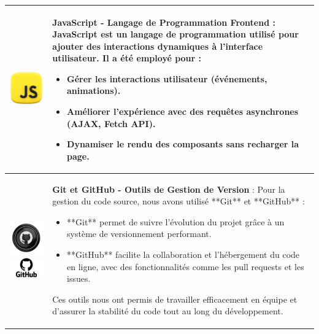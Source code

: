 \begin{longtable}{|m{4cm}|m{10cm}|}
    \includegraphics[width=3cm]{images/logo/javascript.png} & 
    \textbf{JavaScript - Langage de Programmation Frontend} : JavaScript est un langage de programmation utilisé pour ajouter des interactions dynamiques à l'interface utilisateur. Il a été employé pour :  
    \begin{itemize}
        \item Gérer les interactions utilisateur (événements, animations).
        \item Améliorer l'expérience avec des requêtes asynchrones (AJAX, Fetch API).
        \item Dynamiser le rendu des composants sans recharger la page.
    \end{itemize}\\
    \hline

    \includegraphics[width=3cm]{images/logo/git.png}  
    \includegraphics[width=3cm]{images/logo/github.png} & 
    \textbf{Git et GitHub - Outils de Gestion de Version} : Pour la gestion du code source, nous avons utilisé **Git** et **GitHub** :  
    \begin{itemize}
        \item **Git** permet de suivre l'évolution du projet grâce à un système de versionnement performant.
        \item **GitHub** facilite la collaboration et l’hébergement du code en ligne, avec des fonctionnalités comme les pull requests et les issues.
    \end{itemize}
    Ces outils nous ont permis de travailler efficacement en équipe et d’assurer la stabilité du code tout au long du développement.\\
    \hline

\end{longtable}
\begin{center}  
    \label{tab:table_techs_realisation} %
\end{center}  

